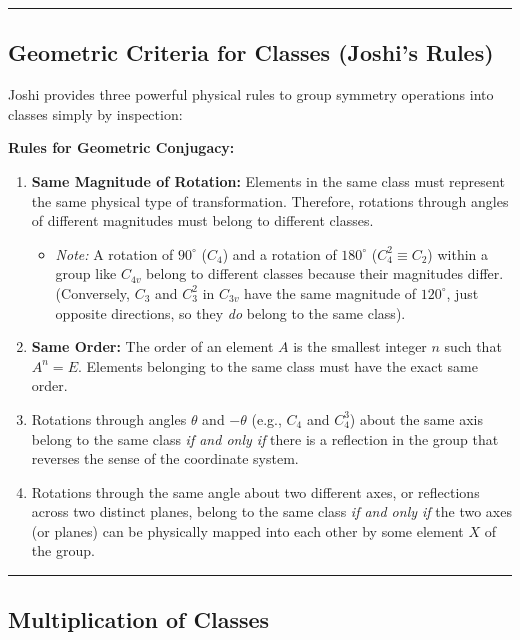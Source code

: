 \documentclass[11pt, a4paper]{report}
\begin{document}
\vspace{1em}
\hrule
\vspace{1em}

\subsection*{Geometric Criteria for Classes (Joshi's Rules)}
Joshi provides three powerful physical rules to group symmetry operations into classes simply by inspection:

\textbf{Rules for Geometric Conjugacy:}
\begin{enumerate}
    \item \textbf{Same Magnitude of Rotation:}
    Elements in the same class must represent the same physical type of transformation. Therefore, rotations through angles of different magnitudes must belong to different classes. 
    \begin{itemize}
        \item \textit{Note:} A rotation of $90^\circ$ ($C_4$) and a rotation of $180^\circ$ ($C_4^2 \equiv C_2$) within a group like $C_{4v}$ belong to different classes because their magnitudes differ. (Conversely, $C_3$ and $C_3^2$ in $C_{3v}$ have the same magnitude of $120^\circ$, just opposite directions, so they \textit{do} belong to the same class).
    \end{itemize}
    \item \textbf{Same Order:}
    The order of an element $A$ is the smallest integer $n$ such that $A^n = E$. Elements belonging to the same class must have the exact same order. 
    \item Rotations through angles $\theta$ and $-\theta$ (e.g., $C_4$ and $C_4^3$) about the same axis belong to the same class \textit{if and only if} there is a reflection in the group that reverses the sense of the coordinate system.
    \item Rotations through the same angle about two different axes, or reflections across two distinct planes, belong to the same class \textit{if and only if} the two axes (or planes) can be physically mapped into each other by some element $X$ of the group.
\end{enumerate}

\vspace{1em}
\hrule
\vspace{1em}

\subsection*{Multiplication of Classes}
\end{document}
